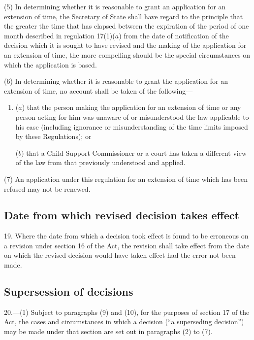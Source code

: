 \documentclass[a4paper,12pt]{article}
\begin{document}
(5) In determining whether it is reasonable to grant an application for an extension of time, the Secretary of State shall have regard to the principle that the greater the time that has elapsed between the expiration of the period of one month described in regulation 17(1)($a$) from the date of notification of the decision which it is sought to have revised and the making of the application for an extension of time, the more compelling should be the special circumstances on which the application is based.

(6) In determining whether it is reasonable to grant the application for an extension of time, no account shall be taken of the following---
\begin{enumerate}\item[]
($a$) that the person making the application for an extension of time or any person acting for him was unaware of or misunderstood the law applicable to his case (including ignorance or misunderstanding of the time limits imposed by these Regulations); or

($b$) that a Child Support Commissioner or a court has taken a different view of the law from that previously understood and applied.
\end{enumerate}

(7) An application under this regulation for an extension of time which has been refused may not be renewed.

\subsection[19. Date from which revised decision takes effect]{Date from which revised decision takes effect}

19.  Where the date from which a decision took effect is found to be erroneous on a revision under section 16 of the Act, the revision shall take effect from the date on which the revised decision would have taken effect had the error not been made.

\subsection[20. Supersession of decisions]{Supersession of decisions}

20.—(1) Subject to paragraphs (9) and (10), for the purposes of section 17 of the Act, the cases and circumstances in which a decision (“a superseding decision”) may be made under that section are set out in paragraphs (2) to (7).
\end{document}
